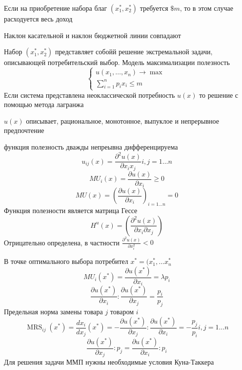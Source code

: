 \documentclass[14pt]{extarticle}
\DeclareMathOperator{\mrs}{MRS}
\begin{document}
Если на приобретение
набора благ $(x_1^{*},x_2^{*})$ 
требуется $\$m$, то в этом случае расходуется весь доход

Наклон касательной и наклон бюджетной линии совпадают

Набор  $(x_1^{*},x_2^{*})$ 
представляет собойй решение экстремальной задачи,
описывающей потребительский выбор. Модель максимализации
полезность
\begin{equation}
\begin{cases}
	u(x_1,\dots,x_{n}) \to \max\\
	\sum_{i = 1}^{n} p_{i} x_{i} \le  m
\end{cases}
\end{equation} 
Если система представлена неоклассической потребность
$u(x)$ то решение с помощью метода лагранжа

 $u(x)$ описывает, рациональное, монотонное, выпуклое и
 непрерывное предпочтение

 функция полезность дважды непреывна дифференцируема
 \begin{equation}
	 u_{ij} (x) = \frac{\partial ^2 u(x)}{\partial x_{i} 
	 x_{j}}  i , j = 1 \dots n
 \end{equation} 
 \begin{equation}
 M U_{i}(x) = \frac{\partial u(x)}{\partial x_{i}} \ge 0
 \end{equation} 
 \begin{equation}
 MU (x) = (\frac{\partial u(x)}{\partial x_{i}})_{i= 1 \dots n} = 0
 \end{equation} 
 Функция полезности является матрица Гессе 
 \begin{equation}
 H^{u}(x) =  (\frac{\partial ^2 u(x)}{\partial x_{i} \partial x_{j} })
 \end{equation} 
 Отрицательно определена, в частности 
 $\frac{\partial ^2 u(x)}{\partial x_{i}^2} < 0$

 В точке оптимального выбора потребител $x^{*} = (x_1 ^*,
 \dots x_{n}^{*}$ 
 \begin{equation}
 MU _{i}(x^{*}) = \frac{\partial u(x^{*})}{\partial x_{i}} = \lambda p_{i}
 \end{equation} 
 \begin{equation}
 \frac{\partial u(x^{*})}{\partial x_{i}} :
 \frac{\partial u (x^{*})}{\partial x_{j}} = \frac{p_{i}}{p_{j}}
 \end{equation} 
 Предельная норма замены товара $j$ товаром  $i$
 \begin{equation}
 \mrs_{ij}(x^{*}) = 
 \frac{dx_{i}}{d x_{j}}(x^{*}) = 
 -\frac{\partial u(x^{*})}{\partial x_{j}} :
 \frac{\partial u(x^{*})}{\partial x_{i}} = -\frac{p_{j}}{p_{i}} i,j  = 1 \dots n
 \end{equation} 
 \begin{equation}
 \frac{\partial u(x^{*})}{\partial x_{j}}  : p_{j} =
 \frac{\partial u(x^{*})}{\partial x_{i}} :p_{i}
 \end{equation} 
 Для решения задачи ММП нужны необходимые условия Куна-Таккера
\end{document}
